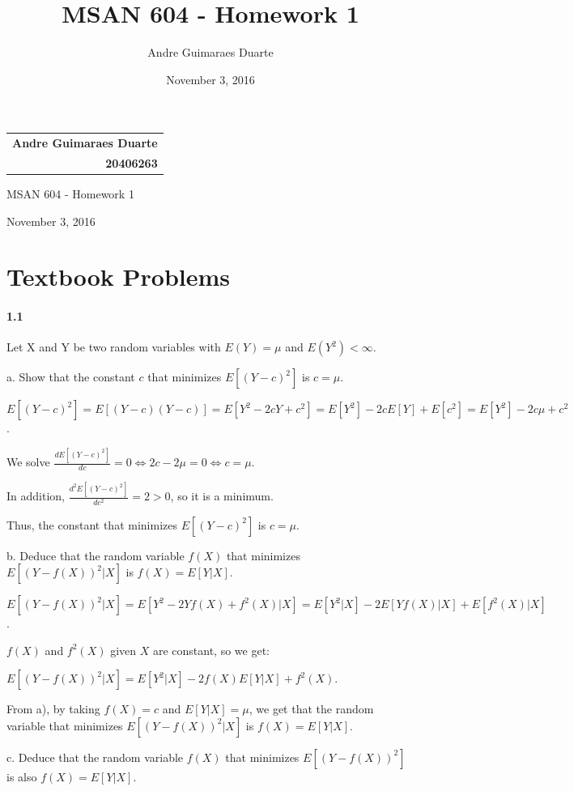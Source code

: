 \documentclass[]{article}
\title{MSAN 604 - Homework 1}
\author{Andre Guimaraes Duarte}
\date{November 3, 2016}
\let\oldparagraph\paragraph
\renewcommand{\paragraph}[1]{\oldparagraph{#1}\mbox{}}
\begin{document}
\null\hfill\begin{tabular}[t]{r@{}}
  \textbf{\LARGE Andre Guimaraes Duarte} \\
  \textbf{\Large 20406263}
\end{tabular}

\begin{center}
\Huge
MSAN 604 - Homework 1

\Large
November 3, 2016

\normalsize
\end{center}

\section{Textbook Problems}
\paragraph{1.1}
Let X and Y be two random variables with $E(Y) = \mu$ and $E(Y^2) < \infty$.

a. Show that the constant $c$ that minimizes $E[(Y - c)^2]$ is $c = \mu$.

\color{blue}
$E[(Y-c)^2] = E[(Y-c)(Y-c)]
            = E[Y^2 - 2cY + c^2]
            = E[Y^2] - 2cE[Y] + E[c^2]
            = E[Y^2] - 2c\mu + c^2$.

We solve $\frac{d E[(Y-c)^2]}{d c} = 0 \Leftrightarrow 2c - 2\mu = 0 \Leftrightarrow c = \mu$.

In addition, $\frac{d^2 E[(Y-c)^2]}{d c^2} = 2 > 0$, so it is a minimum.

Thus, the constant that minimizes $E[(Y - c)^2]$ is $c = \mu$.
\color{black}

b. Deduce that the random variable $f(X)$ that minimizes $E[(Y - f(X))^2|X]$ is $f(X) = E[Y|X]$.

\color{blue}
$E[(Y - f(X))^2|X] = E[Y^2 - 2Yf(X) + f^2(X)|X]
                   = E[Y^2|X] - 2E[Yf(X)|X] + E[f^2(X)|X]$.

$f(X)$ and $f^2(X)$ given $X$ are constant, so we get:

$E[(Y - f(X))^2|X] = E[Y^2|X] - 2f(X)E[Y|X] + f^2(X)$.

From a), by taking $f(X) = c$ and $E[Y|X] = \mu$, we get that the random variable that minimizes $E[(Y - f(X))^2|X]$ is $f(X) = E[Y|X]$.
\color{black}

c. Deduce that the random variable $f(X)$ that minimizes $E[(Y - f(X))^2]$ is also $f(X) = E[Y|X]$.
\end{document}

